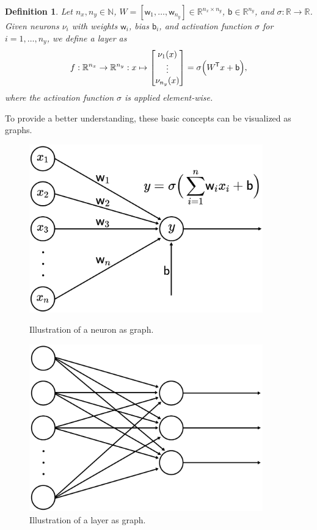 \documentclass[11pt, a4paper]{article}
\newtheorem{definition}[theorem]{Definition}
\newcommand{\N}{\mathbb{N}}
\newcommand{\R}{\mathbb{R}}
\renewcommand{\b}{\mathsf{b}}
\newcommand{\w}{\mathsf{w}}
\newcommand*{\tr}{^{\mkern-1.5mu\mathsf{T}}}
\begin{document}
\begin{definition}  \label{def:layer}
Let $n_x, n_y \in \N$, $W = [\w_1, \dots, \w_{n_y}] \in \R^{n_x \times n_y}$, $\b \in \R^{n_y}$, and $\sigma : \R \to \R$. Given neurons $\nu_i$ with weights $\w_i$, bias $\b_i$, and activation function $\sigma$ for $i=1, \dots, n_y$, we define a layer as
\[ f : \R^{n_x} \to \R^{n_y} : x \mapsto \begin{bmatrix} \nu_1(x) \\ \vdots \\ \nu_{n_y}(x) \end{bmatrix} = \sigma \Big ( W\tr x + \b \Big ), \]
where the activation function $\sigma$ is applied element-wise.
\end{definition}

To provide a better understanding, these basic concepts can be visualized as graphs.

\begin{figure}[!h]
\begin{minipage}[c]{0.5\textwidth}
\centering
\includegraphics[width=0.9\textwidth]{images/neuron.png}
      	\caption{Illustration of a neuron as graph.}
\end{minipage}
\begin{minipage}[c]{0.5\textwidth}
\centering
\includegraphics[width=0.9\textwidth]{images/layer.png}
      	\caption{Illustration of a layer as graph.}
\end{minipage}
\end{figure}
\end{document}

